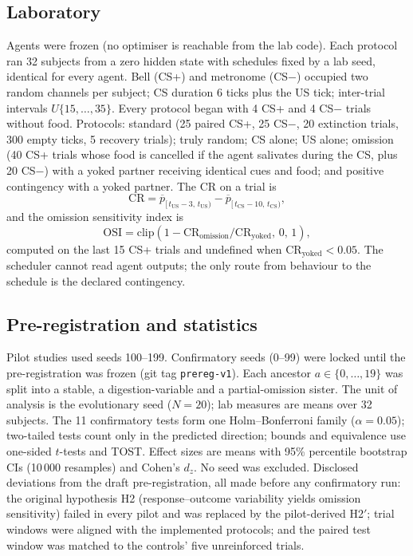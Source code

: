 \documentclass[conference]{IEEEtran}
\begin{document}
\subsection{Laboratory}
Agents were frozen (no optimiser is reachable from the lab code). Each protocol ran 32 subjects from a zero hidden state with schedules fixed by a lab seed, identical for every agent. Bell (CS+) and metronome (CS$-$) occupied two random channels per subject; CS duration 6 ticks plus the US tick; inter-trial intervals $U\{15,\dots,35\}$. Every protocol began with 4 CS+ and 4 CS$-$ trials without food. Protocols: standard (25 paired CS+, 25 CS$-$, 20 extinction trials, 300 empty ticks, 5 recovery trials); truly random; CS alone; US alone; omission (40 CS+ trials whose food is cancelled if the agent salivates during the CS, plus 20 CS$-$) with a yoked partner receiving identical cues and food; and positive contingency with a yoked partner. The CR on a trial is
\begin{equation}
\mathrm{CR}=\overline{p}_{[\,t_{\mathrm{US}}-3,\,t_{\mathrm{US}})}-\overline{p}_{[\,t_{\mathrm{CS}}-10,\,t_{\mathrm{CS}})},
\end{equation}
and the omission sensitivity index is
\begin{equation}
\mathrm{OSI}=\mathrm{clip}\!\left(1-\mathrm{CR}_{\mathrm{omission}}/\mathrm{CR}_{\mathrm{yoked}},\,0,\,1\right),
\end{equation}
computed on the last 15 CS+ trials and undefined when $\mathrm{CR}_{\mathrm{yoked}}<0.05$. The scheduler cannot read agent outputs; the only route from behaviour to the schedule is the declared contingency.

\subsection{Pre-registration and statistics}
Pilot studies used seeds 100--199. Confirmatory seeds (0--99) were locked until the pre-registration was frozen (git tag \texttt{prereg-v1}). Each ancestor $a\in\{0,\dots,19\}$ was split into a stable, a digestion-variable and a partial-omission sister. The unit of analysis is the evolutionary seed ($N=20$); lab measures are means over 32 subjects. The 11 confirmatory tests form one Holm--Bonferroni family ($\alpha=0.05$); two-tailed tests count only in the predicted direction; bounds and equivalence use one-sided $t$-tests and TOST. Effect sizes are means with 95\% percentile bootstrap CIs (10\,000 resamples) and Cohen's $d_z$. No seed was excluded. Disclosed deviations from the draft pre-registration, all made before any confirmatory run: the original hypothesis H2 (response--outcome variability yields omission sensitivity) failed in every pilot and was replaced by the pilot-derived H2$'$; trial windows were aligned with the implemented protocols; and the paired test window was matched to the controls' five unreinforced trials.
\end{document}

